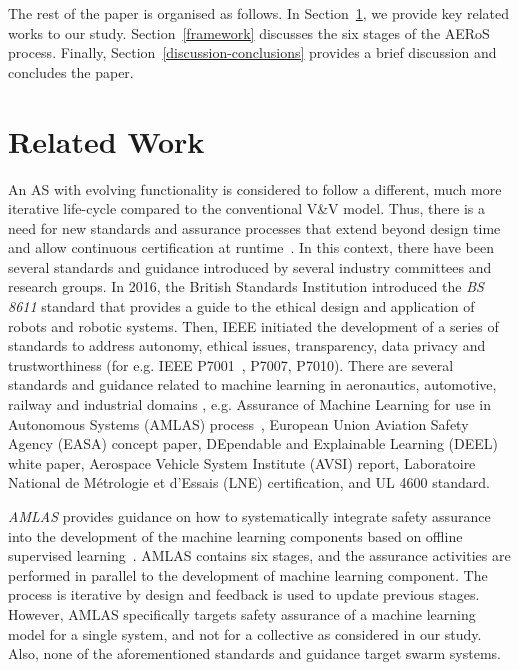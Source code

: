 \documentclass[runningheads]{llncs}
\begin{document}
The rest of the paper is organised as follows. 
In Section~\ref{relatedwork}, we provide key related works to our study. Section~\ref{framework} discusses the six stages of the AERoS process. Finally, Section~\ref{discussion-conclusions} provides a brief discussion and concludes the paper. 

\vspace{-2ex}
\section{Related Work}\label{relatedwork}%
\vspace{-2ex}
An AS with evolving functionality is considered to follow a different, much more iterative life-cycle compared to the conventional V\&V model. 
Thus, there is a need for new standards and assurance processes that extend beyond design time and allow continuous certification at runtime~\cite{Rushby2008}. 
In this context, there have been several standards and guidance introduced by several industry committees and research groups. In 2016, the British Standards Institution introduced the \emph{BS 8611} standard that provides a guide to the ethical design and application of robots and robotic systems. %
Then, IEEE initiated the development of a series of standards to address autonomy, ethical issues, transparency, data privacy and trustworthiness (for e.g. IEEE P7001~\cite{IEEE-P7001}, P7007, P7010). 
There are several standards and guidance related to machine learning in aeronautics, automotive, railway and industrial domains \cite{Kaakai2022}, e.g. Assurance of Machine Learning for use in Autonomous Systems (AMLAS) process~\cite{Hawkins2021}, European Union Aviation Safety Agency (EASA) concept paper, DEpendable and Explainable Learning (DEEL) white paper, Aerospace Vehicle System Institute (AVSI) report, Laboratoire National de Métrologie et d'Essais (LNE) certification, and UL 4600 standard. 

\emph{AMLAS} provides guidance on how to systematically integrate safety assurance into the development of the machine learning components based on offline supervised learning~\cite{Hawkins2021}. 
AMLAS contains six stages, and the assurance activities are performed in parallel to the development of machine learning component. 
The process is iterative by design and feedback is used to update previous stages. 
However, AMLAS specifically targets safety assurance of a machine learning model for a single system, and not for a collective as considered in our study. 
Also, none of the aforementioned standards and guidance target swarm systems. 
\end{document}
